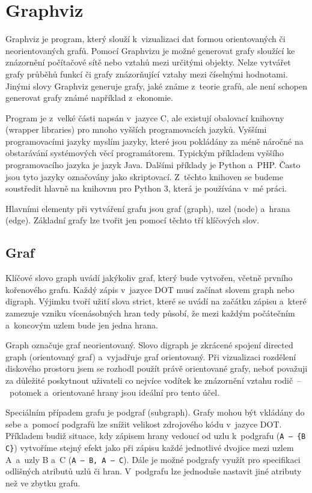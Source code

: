 \documentclass[printed,color,table,oneside,nolot,nolof]{fithesis}
\begin{document}
\section{Graphviz}
	Graphviz je program, který slouží k~vizualizaci dat formou orientovaných či neorientovaných grafů\cite{graphviz}. Pomocí Graphvizu je možné generovat grafy sloužící ke znázornění počítačové sítě nebo
	vztahů mezi určitými objekty. Nelze vytvářet grafy průběhů funkcí či grafy znázorňující vztahy mezi číselnými hodnotami. Jinými slovy Graphviz generuje grafy, jaké známe z~teorie grafů,
	ale není schopen generovat grafy známé například z~ekonomie.

	Program je z~velké části napsán v~jazyce C, ale existují obalovací knihovny (wrapper libraries) pro mnoho vyšších programovacích jazyků. Vyššími 
	programovacími jazyky myslím jazyky, které jsou pokládány za méně náročné na obstarávání systémových věcí programátorem. Typickým příkladem vyššího 
	programovacího jazyka je jazyk Java. Dalšími příklady je Python a~PHP. Často jsou tyto jazyky označovány jako skriptovací. 
	Z~těchto knihoven se budeme soustředit hlavně na knihovnu pro Python 3, která je používána v~mé práci.

	Hlavními elementy při vytváření grafu jsou graf (graph), uzel (node) a~hrana (edge). Základní grafy lze tvořit jen pomocí těchto tří klíčových slov.

\subsection{Graf}
	Klíčové slovo graph uvádí jakýkoliv graf, který bude vytvořen, včetně prvního kořenového grafu. Každý zápis v~jazyce DOT musí začínat slovem graph nebo digraph\cite{digraph}. Výjimku tvoří užití slova
	strict, které se uvádí na začátku zápisu a~které zamezuje vzniku vícenásobných hran tedy působí, že  mezi každým počátečním a~koncovým uzlem bude jen jedna hrana. 

	Graph označuje graf neorientovaný. Slovo digraph je zkrácené spojení directed graph (orientovaný
	graf) a~vyjadřuje graf orientovaný. Při vizualizaci rozdělení diskového prostoru jsem se rozhodl použít právě orientované grafy, neboť považuji za 
	důležité poskytnout uživateli co nejvíce vodítek ke znázornění vztahu rodič~--~potomek a~orientované hrany jsou ideální pro tento účel. 

	Speciálním případem grafu je podgraf (subgraph). Grafy mohou být vkládány do sebe a~pomocí podgrafů lze snížit velikost zdrojového kódu v~jazyce DOT. Příkladem budiž situace, kdy zápisem
	hrany vedoucí od uzlu k~podgrafu (\texttt{A~--~\{B C\}}) vytvoříme stejný efekt jako při zápisu každé jednotlivé dvojice mezi uzlem A~a~uzly B a~C (\texttt{A~--~B, A~--~C}). Dále je možné podgrafy využít
	pro specifikaci odlišných atributů uzlů či hran. V~podgrafu lze jednoduše nastavit jiné atributy než ve zbytku grafu.
\end{document}
